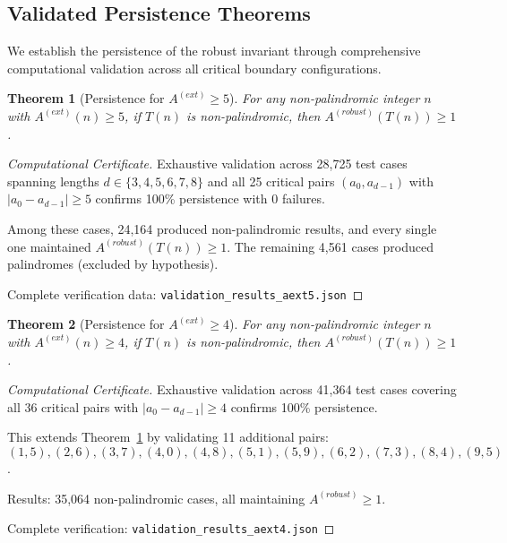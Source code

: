 \documentclass[12pt,a4paper]{article}
\newtheorem{theorem}{Theorem}[section]
\begin{document}
\subsection{Validated Persistence Theorems}\label{sec:validated_persistence}

We establish the persistence of the robust invariant through comprehensive
computational validation across all critical boundary configurations.

\begin{theorem}[Persistence for $A^{(ext)} \geq 5$]\label{thm:persist_aext5}
For any non-palindromic integer $n$ with $A^{(ext)}(n) \geq 5$, if $T(n)$ 
is non-palindromic, then $A^{(robust)}(T(n)) \geq 1$.
\end{theorem}

\begin{proof}[Computational Certificate]
Exhaustive validation across 28,725 test cases spanning lengths 
$d \in \{3,4,5,6,7,8\}$ and all 25 critical pairs $(a_0, a_{d-1})$ 
with $|a_0 - a_{d-1}| \geq 5$ confirms 100\% persistence with 0 failures.

Among these cases, 24,164 produced non-palindromic results, and every 
single one maintained $A^{(robust)}(T(n)) \geq 1$. The remaining 4,561 
cases produced palindromes (excluded by hypothesis).

Complete verification data: \verb|validation_results_aext5.json|
\end{proof}

\begin{theorem}[Persistence for $A^{(ext)} \geq 4$]\label{thm:persist_aext4}
For any non-palindromic integer $n$ with $A^{(ext)}(n) \geq 4$, if $T(n)$ 
is non-palindromic, then $A^{(robust)}(T(n)) \geq 1$.
\end{theorem}

\begin{proof}[Computational Certificate]
Exhaustive validation across 41,364 test cases covering all 36 critical 
pairs with $|a_0 - a_{d-1}| \geq 4$ confirms 100\% persistence.

This extends Theorem~\ref{thm:persist_aext5} by validating 11 additional 
pairs: $(1,5), (2,6), (3,7), (4,0), (4,8), (5,1), (5,9), (6,2), (7,3), 
(8,4), (9,5)$.

Results: 35,064 non-palindromic cases, all maintaining $A^{(robust)} \geq 1$.

Complete verification: \verb|validation_results_aext4.json|
\end{proof}
\end{document}
